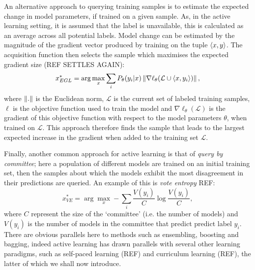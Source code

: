 An alternative approach to querying training samples is to estimate the expected change in model parameters, if trained on a given sample. As, in the active learning setting, it is assumed that the label is unavailable, this is calculated as an average across all potential labels. Model change can be estimated by the magnitude of the gradient vector produced by training on the tuple $\braket{x,y}$. The acquisition function then selects the sample which maximises the expected gradient size (REF SETTLES AGAIN):
\begin{equation}
x^{*}_{EGL} = \arg\max_{x} \sum_{i} P_{\theta}(y_i|x) \left\lVert\nabla \ell_{\theta}(\mathcal{L} \cup \braket{x,y_{i}})\right\rVert,
\end{equation}
where $\left\lVert.\right\rVert$ is the Euclidean norm, $\mathcal{L}$ is the current set of labeled training samples, $\ell$ is the objective function used to train the model and $\nabla \ell_{\theta}(\mathcal{L})$ is the gradient of this objective function with respect to the model parameters $\theta$, when trained on $\mathcal{L}$. This approach therefore finds the sample that leads to the largest expected increase in the gradient when added to the training set $\mathcal{L}$.

Finally, another common approach for active learning is that of \textit{query by committee}; here a population of different models are trained on an initial training set, then the samples about which the models exhibit the most disagreement in their predictions are queried. An example of this is \textit{vote entropy} REF:
\begin{equation}
x_{VE}^{*} = \arg\max_{x} - \sum_{i} \frac{V(y_i)}{C} \log \frac{V(y_i)}{C},
\end{equation}
where $C$ represent the size of the `committee' (i.e. the number of models) and $V(y_i)$ is the number of models in the committee that predict predict label $y_i$. There are obvious parallels here to methods such as ensembling, boosting and bagging, indeed active learning has drawn parallels with several other learning paradigms, such as self-paced learning (REF) and curriculum learning (REF), the latter of which we shall now introduce. 


